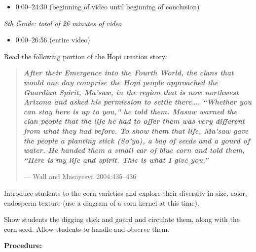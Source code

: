 \documentclass[12pt,]{article}
\providecommand{\tightlist}{%
  \setlength{\itemsep}{0pt}\setlength{\parskip}{0pt}}
\begin{document}
\begin{itemize}
\tightlist
\item
  0:00--24:30 (beginning of video until beginning of conclusion)
\end{itemize}

\emph{8th Grade: total of 26 minutes of video}

\begin{itemize}
\tightlist
\item
  0:00--26:56 (entire video)
\end{itemize}

Read the following portion of the Hopi creation story:

\begin{quote}
\textbf{\emph{After their Emergence into the Fourth World, the clans that would one
day comprise the Hopi people approached the Guardian Spirit, Ma'saw, in
the region that is now northwest Arizona and asked his permission to
settle there\ldots. ``Whether you can stay here is up to you,'' he told them.
Masaw warned the clan people that the life he had to offer them was very
different from what they had before. To show them that life, Ma'saw gave
the people a planting stick (So'ya), a bag of seeds and a gourd of
water. He handed them a small ear of blue corn and told them, ``Here is
my life and spirit. This is what I give you.''}}

--- Wall and Masayesva 2004:435--436
\end{quote}

Introduce students to the corn varieties and explore their diversity
in size, color, endosperm texture (use a diagram of a corn kernel at
this time).

Show students the digging stick and gourd and circulate them, along
with the corn seed. Allow students to handle and observe them.

\textbf{Procedure:}
\end{document}
